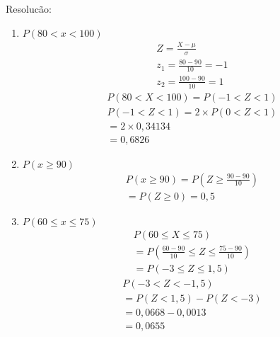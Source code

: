 \documentclass[11pt,a4paper]{book}
\begin{document}
\begin{description}
\begin{description}
    \item {Resolucão:}
      \begin{enumerate}[label=(\alph*)]
        \item $P(80 < x < 100)$
          \begin{align*}
            Z= \frac{X-\mu  }{\sigma} \\
            z_1 = \frac{80-90}{10}=-1\\
            z_2 = \frac{100-90}{10}=1
          \end{align*}
         \begin{align*}
           P(80<X < 100) = P(-1 < Z <1)
         \end{align*} 
         \begin{align*}
           P(-1 < Z < 1)  = 2 \times P(0<Z < 1) \\
           = 2 \times 0,34134 \\
           =0,6826
         \end{align*}

        \item $P(x \geq  90)$
          \begin{align*}
            P(x \geq 90) =P(Z \geq \frac{90-90}{10}) \\
            = P(Z \geq 0)=0,5
          \end{align*}

        \item $P(60 \leq x \leq 75 )$
          \begin{align*}
            P(60 \leq X \leq 75 ) \\
            =P(\frac{60-90}{10} \leq Z \leq \frac{75-90}{10}) \\
            =P(-3 \leq Z \leq 1,5)
          \end{align*}
          \begin{align*}
            P(-3 < Z < -1,5)\\
            =P(Z <1,5)- P(Z< -3) \\
            =0,0668- 0,0013 \\
            =0,0655
          \end{align*}


\end{enumerate}
\end{description}
\end{description}
\end{document}
